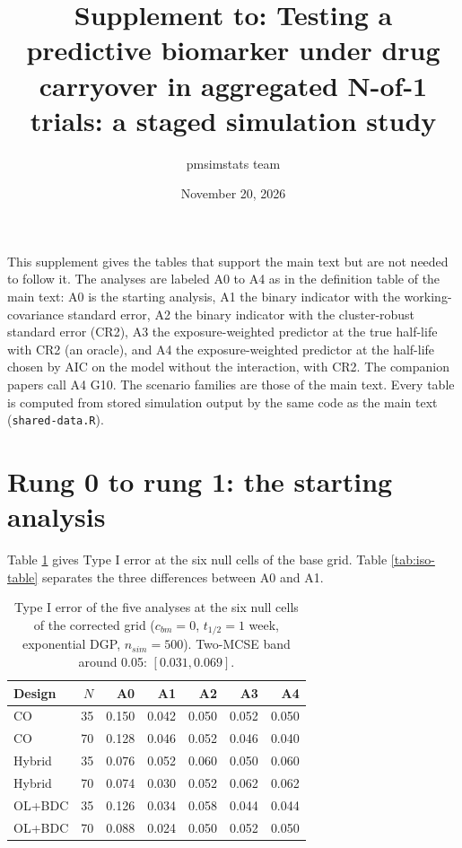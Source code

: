 \documentclass[
  11pt,
]{article}
\title{Supplement to: Testing a predictive biomarker under drug carryover in aggregated N-of-1 trials: a staged simulation study}
\author{pmsimstats team}
\date{November 20, 2026}
\begin{document}
\maketitle

{
\setcounter{tocdepth}{1}
\tableofcontents
}
This supplement gives the tables that support the main text but are
not needed to follow it. The analyses are labeled A0 to A4 as in the
definition table of the main text: A0 is the starting analysis, A1
the binary indicator with the working-covariance standard error, A2
the binary indicator with the cluster-robust standard error (CR2), A3
the exposure-weighted predictor at the true half-life with CR2 (an
oracle), and A4 the exposure-weighted predictor at the half-life
chosen by AIC on the model without the interaction, with CR2. The
companion papers call A4 G10. The scenario families are those of the
main text. Every table is computed from stored simulation output by
the same code as the main text (\texttt{shared-data.R}).

\section{Rung 0 to rung 1: the starting analysis}\label{rung-0-to-rung-1-the-starting-analysis}

Table \ref{tab:stage3-null} gives Type I error at the six null
cells of the base grid. Table \ref{tab:iso-table} separates the
three differences between A0 and A1.

\begin{table}
\centering
\caption{\label{tab:stage3-null}Type I error of the five analyses at the six null cells
    of the corrected grid ($c_{bm} = 0$, $t_{1/2} = 1$ week,
    exponential DGP, $n_{sim} = 500$). Two-MCSE band around 0.05:
    $[0.031, 0.069]$.}
\centering
\fontsize{9}{11}\selectfont
\begin{tabular}[t]{lrrrrrr}
\toprule
Design & $N$ & A0 & A1 & A2 & A3 & A4\\
\midrule
CO & 35 & 0.150 & 0.042 & 0.050 & 0.052 & 0.050\\
CO & 70 & 0.128 & 0.046 & 0.052 & 0.046 & 0.040\\
Hybrid & 35 & 0.076 & 0.052 & 0.060 & 0.050 & 0.060\\
Hybrid & 70 & 0.074 & 0.030 & 0.052 & 0.062 & 0.062\\
OL+BDC & 35 & 0.126 & 0.034 & 0.058 & 0.044 & 0.044\\
\addlinespace
OL+BDC & 70 & 0.088 & 0.024 & 0.050 & 0.052 & 0.050\\
\bottomrule
\end{tabular}
\end{table}
\end{document}
